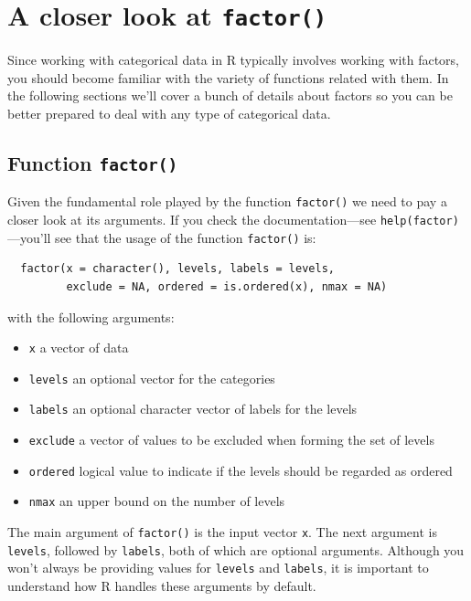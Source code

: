 \documentclass[
]{book}
\providecommand{\tightlist}{%
  \setlength{\itemsep}{0pt}\setlength{\parskip}{0pt}}
\begin{document}
\hypertarget{a-closer-look-at-factor}{%
\section{\texorpdfstring{A closer look at \texttt{factor()}}{A closer look at factor()}}\label{a-closer-look-at-factor}}

Since working with categorical data in R typically involves working with factors,
you should become familiar with the variety of functions related with them. In
the following sections we'll cover a bunch of details about factors so you can
be better prepared to deal with any type of categorical data.

\hypertarget{function-factor}{%
\subsection{\texorpdfstring{Function \texttt{factor()}}{Function factor()}}\label{function-factor}}

Given the fundamental role played by the function \texttt{factor()} we need to pay a
closer look at its arguments. If you check the documentation---see
\texttt{help(factor)}---you'll see that the usage of the function \texttt{factor()} is:

\begin{verbatim}
  factor(x = character(), levels, labels = levels,
         exclude = NA, ordered = is.ordered(x), nmax = NA)
\end{verbatim}

with the following arguments:

\begin{itemize}
\tightlist
\item
  \texttt{x} a vector of data
\item
  \texttt{levels} an optional vector for the categories
\item
  \texttt{labels} an optional character vector of labels for the levels
\item
  \texttt{exclude} a vector of values to be excluded when forming the set of levels
\item
  \texttt{ordered} logical value to indicate if the levels should be regarded as ordered
\item
  \texttt{nmax} an upper bound on the number of levels
\end{itemize}

The main argument of \texttt{factor()} is the input vector \texttt{x}. The next argument is
\texttt{levels}, followed by \texttt{labels}, both of which are optional arguments. Although
you won't always be providing values for \texttt{levels} and \texttt{labels}, it is important
to understand how R handles these arguments by default.
\end{document}
